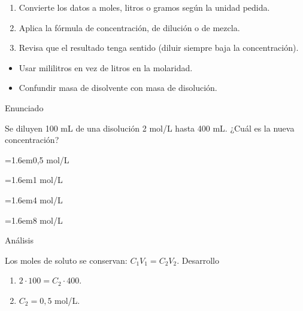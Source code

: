 \documentclass[10pt,a4paper,twocolumn]{article}
\newcommand{\alternativa}[2]{\par\noindent\hangindent=1.6em\hangafter=1\makebox[1.6em][l]{\tecla{#1}}#2\par}
\newcommand{\clave}[1]{\par\smallskip{\sffamily\footnotesize\color{esmeralda} Clave \teclaok{#1}}\par}
\begin{document}
\begin{metodo}
\begin{enumerate}
  \item Convierte los datos a moles, litros o gramos según la unidad pedida.
  \item Aplica la fórmula de concentración, de dilución o de mezcla.
  \item Revisa que el resultado tenga sentido (diluir siempre baja la concentración).
\end{enumerate}
\end{metodo}

\begin{errorfrecuente}
\begin{itemize}
  \item Usar mililitros en vez de litros en la molaridad.
  \item Confundir masa de disolvente con masa de disolución.
\end{itemize}
\end{errorfrecuente}

\begin{ejemplo}
{\sffamily\footnotesize\color{zinc500} Enunciado}\par
Se diluyen 100 mL de una disolución 2 mol/L hasta 400 mL. ¿Cuál es la nueva concentración?
\alternativa{A}{0,5 mol/L}
\alternativa{B}{1 mol/L}
\alternativa{C}{4 mol/L}
\alternativa{D}{8 mol/L}
\clave{A}
{\sffamily\footnotesize\color{zinc500} Análisis}\par Los moles de soluto se conservan: $C_1V_1=C_2V_2$.
{\sffamily\footnotesize\color{zinc500} Desarrollo}
\begin{enumerate}
  \item $2\cdot 100=C_2\cdot 400$.
  \item $C_2=0{,}5$ mol/L.
\end{enumerate}
\end{ejemplo}
\end{document}
